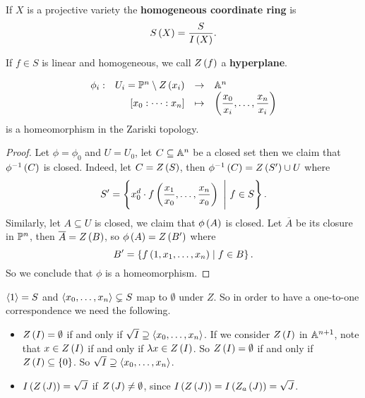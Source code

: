 \begin{definition}
If $ X $ is a projective variety the \textbf{homogeneous coordinate ring} is
$$ S\rb{X} = \dfrac{S}{I\rb{X}}. $$
\end{definition}

\begin{definition}
If $ f \in S $ is linear and homogeneous, we call $ Z\rb{f} $ a \textbf{hyperplane}.
\end{definition}


\begin{proposition}
$$ \function[\phi_i]{U_i = \P^n \setminus Z\rb{x_i}}{\A^n}{\sb{x_0 : \dots : x_n}}{\rb{\dfrac{x_0}{x_i}, \dots, \dfrac{x_n}{x_i}}} $$
is a homeomorphism in the Zariski topology.
\end{proposition}

\begin{proof}
Let $ \phi = \phi_0 $ and $ U = U_0 $, let $ C \subseteq \A^n $ be a closed set then we claim that $ \phi^{-1}\rb{C} $ is closed. Indeed, let $ C = Z\rb{S} $, then $ \phi^{-1}\rb{C} = Z\rb{S'} \cup U $ where
$$ S' = \cb{x_0^d \cdot f\rb{\dfrac{x_1}{x_0}, \dots, \dfrac{x_n}{x_0}} \ \Bigg| \ f \in S}. $$
Similarly, let $ A \subseteq U $ is closed, we claim that $ \phi\rb{A} $ is closed. Let $ \overline{A} $ be its closure in $ \P^n $, then $ \overline{A} = Z\rb{B} $, so $ \phi\rb{A} = Z\rb{B'} $ where
$$ B' = \cb{f\rb{1, x_1, \dots, x_n} \mid f \in B}. $$
So we conclude that $ \phi $ is a homeomorphism.
\end{proof}

\begin{note*}
$ \ab{1} = S $ and $ \ab{x_0, \dots, x_n} \subsetneq S $ map to $ \emptyset $ under $ Z $. So in order to have a one-to-one correspondence we need the following.
\begin{itemize}
\item $ Z\rb{I} = \emptyset $ if and only if $ \sqrt{I} \supseteq \ab{x_0, \dots, x_n} $. If we consider $ Z\rb{I} $ in $ \A^{n + 1} $, note that $ x \in Z\rb{I} $ if and only if $ \lambda x \in Z\rb{I} $. So $ Z\rb{I} = \emptyset $ if and only if $ Z\rb{I} \subseteq \cb{0} $. So $ \sqrt{I} \supseteq \ab{x_0, \dots, x_n} $.
\item $ I\rb{Z\rb{J}} = \sqrt{J} $ if $ Z\rb{J} \ne \emptyset $, since $ I\rb{Z\rb{J}} = I\rb{Z_a\rb{J}} = \sqrt{J} $.
\end{itemize}
\end{note*}


